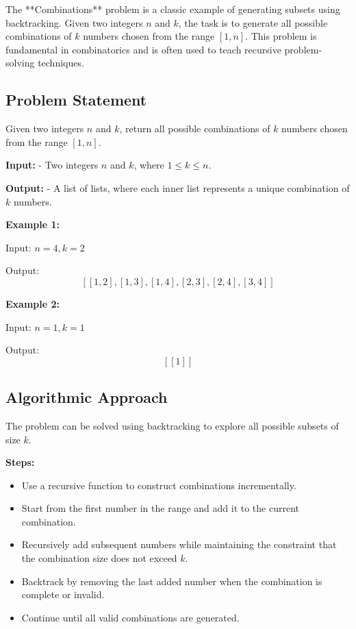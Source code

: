 
\label{problem:Combinations}

The **Combinations** problem is a classic example of generating subsets using backtracking. Given two integers \( n \) and \( k \), the task is to generate all possible combinations of \( k \) numbers chosen from the range \([1, n]\). This problem is fundamental in combinatorics and is often used to teach recursive problem-solving techniques.

\subsection*{Problem Statement}
Given two integers \( n \) and \( k \), return all possible combinations of \( k \) numbers chosen from the range \([1, n]\).

\textbf{Input:}
- Two integers \( n \) and \( k \), where \( 1 \leq k \leq n \).

\textbf{Output:}
- A list of lists, where each inner list represents a unique combination of \( k \) numbers.

\textbf{Example 1:}

Input: \( n = 4, k = 2 \)

Output: \[
\left[ 
[1, 2], [1, 3], [1, 4], [2, 3], [2, 4], [3, 4] 
\right]
\]

\textbf{Example 2:}

Input: \( n = 1, k = 1 \)

Output: \[
\left[
[1]
\right]
\]

\subsection*{Algorithmic Approach}
The problem can be solved using backtracking to explore all possible subsets of size \( k \).

\textbf{Steps:}
\begin{itemize}
    \item Use a recursive function to construct combinations incrementally.
    \item Start from the first number in the range and add it to the current combination.
    \item Recursively add subsequent numbers while maintaining the constraint that the combination size does not exceed \( k \).
    \item Backtrack by removing the last added number when the combination is complete or invalid.
    \item Continue until all valid combinations are generated.
\end{itemize}

